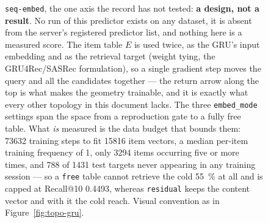 \begin{figure}[ht]
  \caption{\texttt{seq-embed}, the one axis the record has not tested:
    \textbf{a design, not a result}. No run of this predictor exists on any
    dataset, it is absent from the server's registered predictor list, and
    nothing here is a measured score. The item table $E$ is used twice, as the
    GRU's input embedding and as the retrieval target (weight tying, the
    GRU4Rec/SASRec formulation), so a single gradient step moves the query and
    all the candidates together --- the return arrow along the top is what
    makes the geometry trainable, and it is exactly what every other topology
    in this document lacks. The three \texttt{embed\_mode} settings span the
    space from a reproduction gate to a fully free table. What \emph{is}
    measured is the data budget that bounds them: \num{73632} training steps
    to fit \num{15816} item vectors, a median per-item training frequency of
    \num{1}, only \num{3294} items occurring five or more times, and
    \num{788} of \num{1431} test targets never appearing in any training
    session --- so a \texttt{free} table cannot retrieve the cold
    \SI{55}{\percent} at all and is capped at Recall@10 \num{0.4493}, whereas
    \texttt{residual} keeps the content vector and with it the cold reach.
    Visual convention as in Figure~\ref{fig:topo-gru}.}
  \label{fig:topo-embed}
\end{figure}



